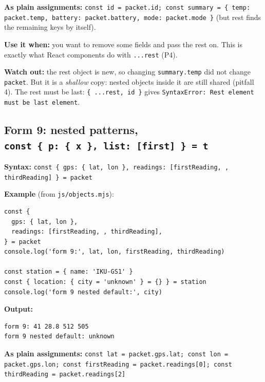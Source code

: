 \textbf{As plain assignments:} \passthrough{\lstinline!const id = packet.id; const summary = \{ temp: packet.temp, battery: packet.battery, mode: packet.mode \}!} (but rest finds the remaining keys by itself).

\textbf{Use it when:} you want to remove some fields and pass the rest on. This is exactly what React components do with \passthrough{\lstinline!...rest!} (P4).

\textbf{Watch out:} the rest object is new, so changing \passthrough{\lstinline!summary.temp!} did not change \passthrough{\lstinline!packet!}. But it is a \emph{shallow} copy: nested objects inside it are still shared (pitfall 4). The rest must be last: \passthrough{\lstinline!\{ ...rest, id \}!} gives \passthrough{\lstinline!SyntaxError: Rest element must be last element!}.

\hypertarget{form-9-nested-patterns-const--p--x--list-first---t}{%
\subsection{\texorpdfstring{Form 9: nested patterns, \texttt{const\ \{\ p:\ \{\ x\ \},\ list:\ {[}first{]}\ \}\ =\ t}}{Form 9: nested patterns, const \{ p: \{ x \}, list: {[}first{]} \} = t}}\label{form-9-nested-patterns-const--p--x--list-first---t}}

\textbf{Syntax:} \passthrough{\lstinline!const \{ gps: \{ lat, lon \}, readings: [firstReading, , thirdReading] \} = packet!}

\textbf{Example} (from \passthrough{\lstinline!js/objects.mjs!}):

\begin{lstlisting}
const {
  gps: { lat, lon },
  readings: [firstReading, , thirdReading],
} = packet
console.log('form 9:', lat, lon, firstReading, thirdReading)

const station = { name: 'IKU-GS1' }
const { location: { city = 'unknown' } = {} } = station
console.log('form 9 nested default:', city)
\end{lstlisting}

\textbf{Output:}

\begin{lstlisting}
form 9: 41 28.8 512 505
form 9 nested default: unknown
\end{lstlisting}

\textbf{As plain assignments:} \passthrough{\lstinline!const lat = packet.gps.lat; const lon = packet.gps.lon; const firstReading = packet.readings[0]; const thirdReading = packet.readings[2]!}

